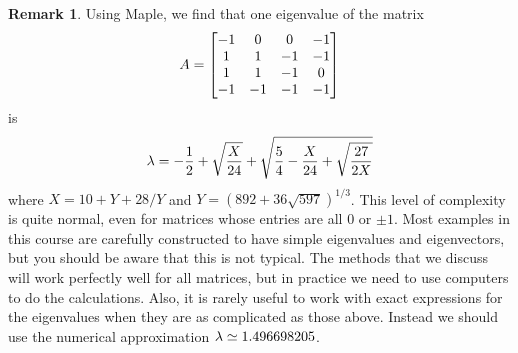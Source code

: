 \documentclass[reqno]{amsart}
\theoremstyle{definition}
\newtheorem{remark}[theorem]{Remark}
\begin{document}
\begin{remark}\label{rem-nasty}
 Using Maple, we find that one eigenvalue of the matrix
 \[ A = \left[\begin{matrix} -1 &  0 &  0 & -1 \\
              1 &  1 & -1 & -1 \\
              1 &  1 & -1 &  0 \\
             -1 & -1 & -1 & -1
        \end{matrix}\right]
 \]
 is
 \[ \lambda = -\frac{1}{2} + \sqrt{\frac{X}{24}} +
          \sqrt{\frac{5}{4}-\frac{X}{24}+\sqrt{\frac{27}{2X}}}
 \]
 where $X=10+Y+28/Y$ and $Y=(892+36\sqrt{597})^{1/3}$.  This level of
 complexity is quite normal, even for matrices whose entries are all
 $0$ or $\pm 1$.  Most examples in this course are carefully
 constructed to have simple eigenvalues and eigenvectors, but you
 should be aware that this is not typical.  The methods that we
 discuss will work perfectly well for all matrices, but in practice we
 need to use computers to do the calculations.  Also, it is rarely
 useful to work with exact expressions for the eigenvalues when they
 are as complicated as those above.  Instead we should use the
 numerical approximation $\lambda\simeq 1.496698205$.
\end{remark}
\end{document}
